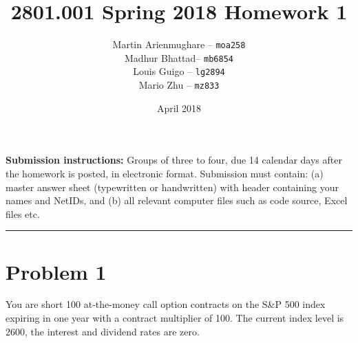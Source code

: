 \documentclass[12pt]{article}
\title{\vspace{-3cm}2801.001 Spring 2018 Homework 1 }
\author{Martin Arienmughare -- \texttt{moa258}\\
		Madhur Bhattad-- \texttt{mb6854}\\
		Louis Guigo -- \texttt{lg2894}\\
		Mario Zhu -- \texttt{mz833}}
\date{April 2018}
\begin{document}
	\maketitle
\textbf{Submission instructions:} Groups of three to four, due 14 calendar days after the homework is posted, in
electronic format. Submission must contain: (a) master answer sheet (typewritten or handwritten) with
header containing your names and NetIDs, and (b) all relevant computer files such as code source, Excel
files etc.

	\noindent
	\rule{\linewidth}{0.4pt}
	
	\section*{Problem 1}
You are short 100 at-the-money call option contracts on the S\&P 500 index expiring in one year with a contract multiplier of 100. The current index level is 2600, the interest and dividend rates are zero.
\end{document}
